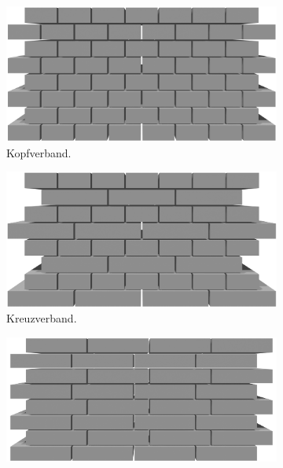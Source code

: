 \begin{figure}[htb]
  \hspace*{\fill}%
  \begin{subfigure}[b]{0.4\columnwidth}
    \includegraphics[width=\columnwidth]{fig/basics_headbond.png}
    \caption{Kopfverband.}
  \end{subfigure}
  \hfill
  \begin{subfigure}[b]{0.4\columnwidth}
    \includegraphics[width=\columnwidth]{fig/basics_crossbond.png}
    \caption{Kreuzverband.}
  \end{subfigure}
  \hspace*{\fill}%
  \begin{subfigure}[b]{0.4\columnwidth}
    \includegraphics[width=\columnwidth]{fig/basics_stretchedbond25_mittig.png}

\end{subfigure}
\end{figure}
